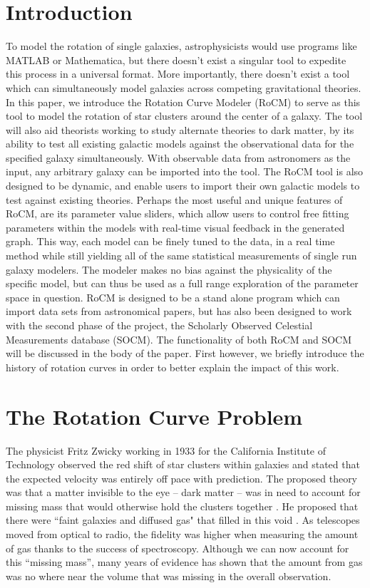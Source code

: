 \documentclass[conference]{IEEEtran-modified}
\begin{document}
\section{Introduction}
To model the rotation of single galaxies, astrophysicists would use programs like MATLAB or Mathematica, but there doesn't exist a singular tool to expedite this process in a universal format.   More importantly, there doesn't exist a tool which can simultaneously model galaxies across competing gravitational theories.  In this paper, we introduce the Rotation Curve Modeler (RoCM) to serve as this tool to model the rotation of star clusters around the center of a galaxy. The tool will also aid theorists working to study alternate theories to dark matter, by its ability to test all existing galactic models against the observational data for the specified galaxy simultaneously. With observable data from astronomers as the input, any arbitrary galaxy can be imported into the tool. The RoCM tool is also designed to be dynamic, and enable users to import their own galactic models to test against existing theories.  Perhaps the most useful and unique features of RoCM, are its parameter value sliders, which allow users to control free fitting parameters within the models with real-time visual feedback in the generated graph. This way, each model can be finely tuned to the data, in a real time method while still yielding all of the same statistical measurements of single run galaxy modelers. The modeler makes no bias against the physicality of the specific model, but can thus be used as a full range exploration of the parameter space in question.  RoCM is designed to be a stand alone program which can import data sets from astronomical papers, but has also been designed to work with the second phase of the project, the Scholarly Observed Celestial Measurements database (SOCM). The functionality of both RoCM and SOCM will be discussed in the body of the paper.  First however, we briefly introduce the history of rotation curves in order to better explain the impact of this work.


\section{The Rotation Curve Problem}
The physicist Fritz Zwicky working in 1933 for the California Institute of Technology observed the red shift of star clusters within galaxies and stated that the expected velocity was entirely off pace with prediction. The proposed theory was that a matter invisible to the eye -- dark matter -- was in need to account for missing mass that would otherwise hold the clusters together \cite{zwicky}. He proposed that there were ``faint galaxies and diffused gas" that filled in this void \cite{zwicky}.  As telescopes moved from optical to radio, the fidelity was higher when measuring the amount of gas thanks to the success of spectroscopy.  Although we can now account for this ``missing mass'', many years of evidence has shown that the amount from gas was no where near the volume that was missing in the overall observation. 
\end{document}
